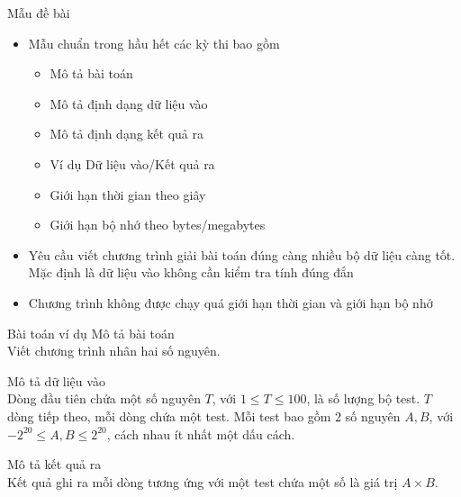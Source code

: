 \documentclass{beamer}
\newcommand{\bi}{\begin{itemize}}
\newcommand{\ei}{\end{itemize}}
\begin{document}
\begin{frame}{Mẫu đề bài}
    \bi
        \item Mẫu chuẩn trong hầu hết các kỳ thi bao gồm
        
            \bi
                \item Mô tả bài toán
                \item Mô tả định dạng dữ liệu vào
                \item Mô tả định dạng kết quả ra
                \item Ví dụ Dữ liệu vào/Kết quả ra
                \item Giới hạn thời gian theo giây
                \item Giới hạn bộ nhớ theo bytes/megabytes
            \ei
        \item Yêu cầu viết chương trình giải bài toán đúng càng nhiều bộ dữ liệu càng tốt. Mặc định là dữ liệu vào không cần kiểm tra tính đúng đắn
        \item Chương trình không được chạy quá giới hạn thời gian và giới hạn bộ nhớ
    \ei
\end{frame}

\begin{frame}{Bài toán ví dụ}
    \vspace{10pt}
    {\footnotesize\color{title}Mô tả bài toán}\\
    Viết chương trình nhân hai số nguyên.

    \vspace{10pt}

    {\footnotesize\color{title}Mô tả dữ liệu vào}\\
    Dòng đầu tiên chứa một số nguyên $T$, với $1\leq T \leq
    100$, là số lượng bộ test. $T$ dòng tiếp theo, mỗi dòng chứa một test. Mỗi test bao gồm 2 số nguyên $A,B$,
    với $-2^{20} \leq A,B \leq 2^{20}$, cách nhau ít nhất một dấu cách.

    \vspace{10pt}

    {\footnotesize\color{title}Mô tả kết quả ra}\\
    Kết quả ghi ra mỗi dòng tương ứng với một test chứa một số là giá trị $A\times B$.
\end{frame}
\end{document}
